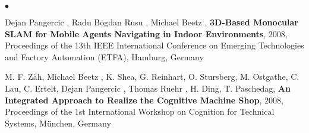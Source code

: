 \documentclass[margin,line]{res}
\newenvironment{list2}{
  \begin{list}{$\bullet$}{%
      \setlength{\itemsep}{0in}
      \setlength{\parsep}{0in} \setlength{\parskip}{0in}
      \setlength{\topsep}{0in} \setlength{\partopsep}{0in} 
      \setlength{\leftmargin}{0.2in}}}{\end{list}}
\begin{document}
\begin{resume}
{\begin{list2}
\item Dejan Pangercic , Radu Bogdan Rusu , Michael Beetz , \textbf{3D-Based Monocular SLAM for Mobile Agents Navigating in Indoor Environments}, 2008, Proceedings of the 13th IEEE International Conference on Emerging Technologies and Factory Automation (ETFA), Hamburg, Germany\\
\item M. F. Zäh, Michael Beetz , K. Shea, G. Reinhart, O. Stursberg, M. Ostgathe, C. Lau, C. Ertelt, Dejan Pangercic , Thomas Ruehr , H. Ding, T. Paschedag, \textbf{An Integrated Approach to Realize the Cognitive Machine Shop}, 2008, Proceedings of the 1st International Workshop on Cognition for Technical Systems, M{\"u}nchen, Germany\\
\end{list2}}
\end{resume}
\end{document}
